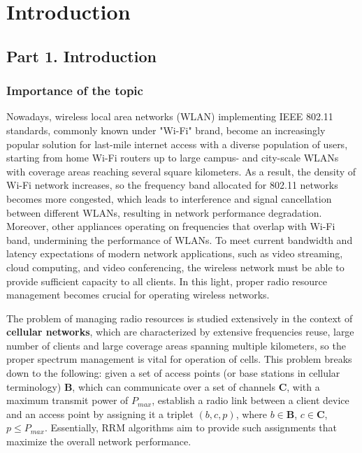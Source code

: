 \chapter{Introduction}
\label{chap:intro}
\chaptermark{}

\section{Part 1. Introduction}
\subsection{Importance of the topic}
Nowadays, wireless local area networks (WLAN) implementing IEEE 802.11 standards, commonly known under "Wi-Fi" brand, become an increasingly popular solution for last-mile internet access with a diverse population of users, starting from home Wi-Fi routers up to large campus- and city-scale WLANs with coverage areas reaching several square kilometers.
As a result, the density of Wi-Fi network increases, so the frequency band allocated for 802.11 networks becomes more congested, which leads to interference and signal cancellation between different WLANs, resulting in network performance degradation.
Moreover, other appliances operating on frequencies that overlap with Wi-Fi band, undermining the performance of WLANs.
To meet current bandwidth and latency expectations of modern network applications, such as video streaming, cloud computing, and video conferencing, the wireless network must be able to provide sufficient capacity to all clients. In this light, proper radio resource management becomes crucial for operating wireless networks.

The problem of managing radio resources is studied extensively in the context of \textbf{cellular networks}, which are characterized by extensive frequencies reuse, large number of clients and large coverage areas spanning multiple kilometers, so the proper spectrum management is vital for operation of cells. This problem breaks down to the following: given a set of access points (or base stations in cellular terminology) $\boldsymbol{B}$, which can communicate over a set of channels $\boldsymbol{C}$, with a maximum transmit power of $P_{max}$, establish a radio link between a client device and an access point by assigning it a triplet $(b, c, p)$, where $b \in \boldsymbol{B}$, $c \in \boldsymbol{C}$, $p \leq P_{max}$.
Essentially, RRM algorithms aim to provide such assignments that maximize the overall network performance.
